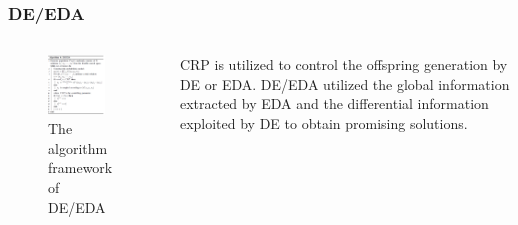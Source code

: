 \documentclass[xcolor=dvipsnames]{beamer}
\begin{document}
    \begin{frame}
    \frametitle{DE/EDA}
    \begin{columns}
        \begin{column}{0.5\textwidth}
        \begin{figure}[H]
            \graphicspath{{figs/}}
            \includegraphics[width=0.8\textwidth]{deeda.png}
            \caption{The algorithm framework of DE/EDA}
        \end{figure}
    \end{column}
    \begin{column}{0.5\textwidth}
    CRP is utilized to control the offspring generation by DE or EDA. DE/EDA utilized the global information extracted by EDA and the differential information exploited by DE to obtain promising solutions.
    \end{column}
    \end{columns}
    \end{frame}
\end{document}

